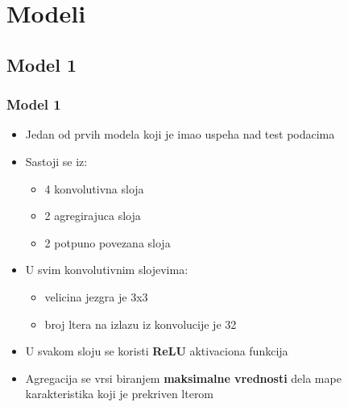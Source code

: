 \documentclass{beamer}
\begin{document}

\section{Modeli}

\subsection{Model 1}
\begin{frame}
\frametitle{Model 1}

\begin{itemize}

\item Jedan od prvih modela koji je imao uspeha nad test podacima
\item Sastoji se iz:
\begin{itemize}
\item 4 konvolutivna sloja
\item 2 agregirajuca sloja
\item 2 potpuno povezana sloja
\end{itemize}

\item U svim konvolutivnim slojevima:
\begin{itemize}
\item velicina jezgra je 3x3
\item broj ltera na izlazu iz konvolucije je 32
\end{itemize}


\item U svakom sloju se koristi \textbf{ReLU} aktivaciona funkcija
\item Agregacija se vrsi biranjem \textbf{maksimalne vrednosti} dela mape karakteristika koji je prekriven lterom

\end{itemize}


\end{frame}
\end{document}
